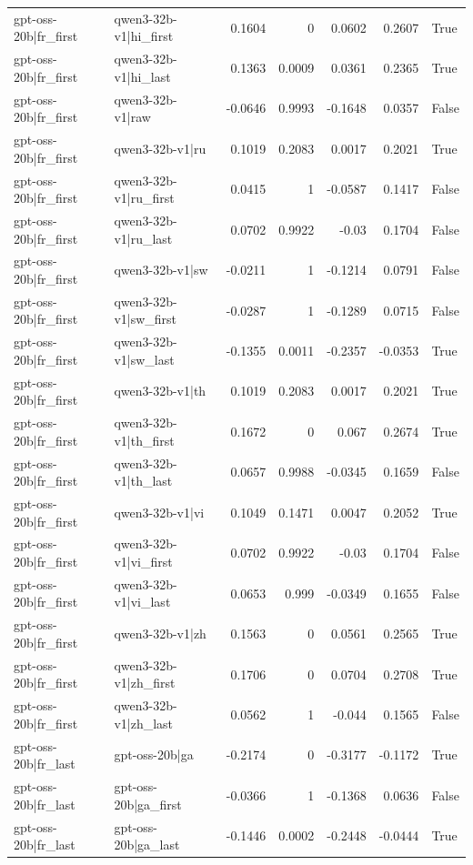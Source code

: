 \begin{table}
\begin{tabular}{l l r r r r l}
gpt-oss-20b|fr_first & qwen3-32b-v1|hi_first & 0.1604 & 0 & 0.0602 & 0.2607 & True \\
gpt-oss-20b|fr_first & qwen3-32b-v1|hi_last & 0.1363 & 0.0009 & 0.0361 & 0.2365 & True \\
gpt-oss-20b|fr_first & qwen3-32b-v1|raw & -0.0646 & 0.9993 & -0.1648 & 0.0357 & False \\
gpt-oss-20b|fr_first & qwen3-32b-v1|ru & 0.1019 & 0.2083 & 0.0017 & 0.2021 & True \\
gpt-oss-20b|fr_first & qwen3-32b-v1|ru_first & 0.0415 & 1 & -0.0587 & 0.1417 & False \\
gpt-oss-20b|fr_first & qwen3-32b-v1|ru_last & 0.0702 & 0.9922 & -0.03 & 0.1704 & False \\
gpt-oss-20b|fr_first & qwen3-32b-v1|sw & -0.0211 & 1 & -0.1214 & 0.0791 & False \\
gpt-oss-20b|fr_first & qwen3-32b-v1|sw_first & -0.0287 & 1 & -0.1289 & 0.0715 & False \\
gpt-oss-20b|fr_first & qwen3-32b-v1|sw_last & -0.1355 & 0.0011 & -0.2357 & -0.0353 & True \\
gpt-oss-20b|fr_first & qwen3-32b-v1|th & 0.1019 & 0.2083 & 0.0017 & 0.2021 & True \\
gpt-oss-20b|fr_first & qwen3-32b-v1|th_first & 0.1672 & 0 & 0.067 & 0.2674 & True \\
gpt-oss-20b|fr_first & qwen3-32b-v1|th_last & 0.0657 & 0.9988 & -0.0345 & 0.1659 & False \\
gpt-oss-20b|fr_first & qwen3-32b-v1|vi & 0.1049 & 0.1471 & 0.0047 & 0.2052 & True \\
gpt-oss-20b|fr_first & qwen3-32b-v1|vi_first & 0.0702 & 0.9922 & -0.03 & 0.1704 & False \\
gpt-oss-20b|fr_first & qwen3-32b-v1|vi_last & 0.0653 & 0.999 & -0.0349 & 0.1655 & False \\
gpt-oss-20b|fr_first & qwen3-32b-v1|zh & 0.1563 & 0 & 0.0561 & 0.2565 & True \\
gpt-oss-20b|fr_first & qwen3-32b-v1|zh_first & 0.1706 & 0 & 0.0704 & 0.2708 & True \\
gpt-oss-20b|fr_first & qwen3-32b-v1|zh_last & 0.0562 & 1 & -0.044 & 0.1565 & False \\
gpt-oss-20b|fr_last & gpt-oss-20b|ga & -0.2174 & 0 & -0.3177 & -0.1172 & True \\
gpt-oss-20b|fr_last & gpt-oss-20b|ga_first & -0.0366 & 1 & -0.1368 & 0.0636 & False \\
gpt-oss-20b|fr_last & gpt-oss-20b|ga_last & -0.1446 & 0.0002 & -0.2448 & -0.0444 & True \\

\end{tabular}
\end{table}
